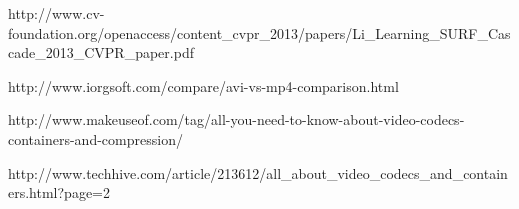 \documentclass[letterpaper,10pt,onecolumn,draftclsnofoot]{IEEEtran}
\begin{document}
\begin{thebibliography}{99}
http://www.cv-foundation.org/openaccess/content\_cvpr\_2013/papers/Li\_Learning\_SURF\_Cascade\_2013\_CVPR\_paper.pdf

http://www.iorgsoft.com/compare/avi-vs-mp4-comparison.html

http://www.makeuseof.com/tag/all-you-need-to-know-about-video-codecs-containers-and-compression/

http://www.techhive.com/article/213612/all\_about\_video\_codecs\_and\_containers.html?page=2


\end{thebibliography}


%



\end{document}
